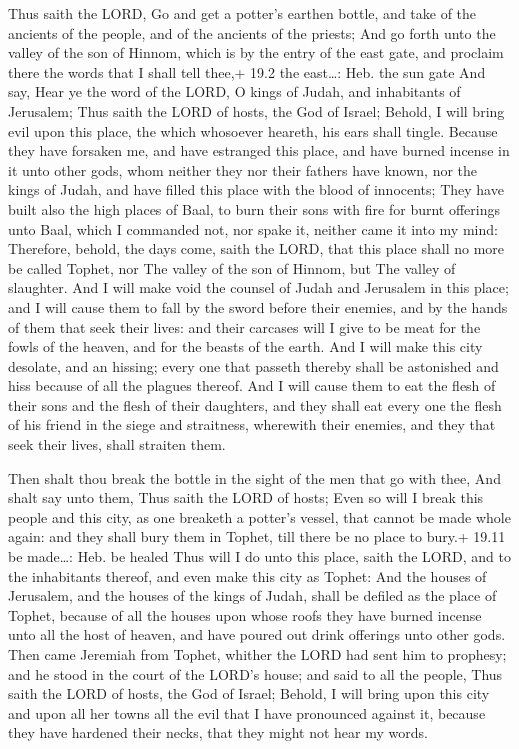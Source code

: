  Thus saith the LORD, Go and get a potter's earthen bottle,
and take of the ancients of the people, and of the ancients of the
priests;  And go forth unto the valley of the son of Hinnom,
which is by the entry of the east gate, and proclaim there the words
that I shall tell thee,+ 19.2 the east\ldots: Heb. the sun gate
 And say, Hear ye the word of the LORD, O kings of Judah,
and inhabitants of Jerusalem; Thus saith the LORD of hosts, the God of
Israel; Behold, I will bring evil upon this place, the which whosoever
heareth, his ears shall tingle.  Because they have forsaken
me, and have estranged this place, and have burned incense in it unto
other gods, whom neither they nor their fathers have known, nor the
kings of Judah, and have filled this place with the blood of innocents;
 They have built also the high places of Baal, to burn their
sons with fire for burnt offerings unto Baal, which I commanded not, nor
spake it, neither came it into my mind:  Therefore, behold,
the days come, saith the LORD, that this place shall no more be called
Tophet, nor The valley of the son of Hinnom, but The valley of
slaughter.  And I will make void the counsel of Judah and
Jerusalem in this place; and I will cause them to fall by the sword
before their enemies, and by the hands of them that seek their lives:
and their carcases will I give to be meat for the fowls of the heaven,
and for the beasts of the earth.  And I will make this city
desolate, and an hissing; every one that passeth thereby shall be
astonished and hiss because of all the plagues thereof.  And
I will cause them to eat the flesh of their sons and the flesh of their
daughters, and they shall eat every one the flesh of his friend in the
siege and straitness, wherewith their enemies, and they that seek their
lives, shall straiten them.

 Then shalt thou break the bottle in the sight of the men
that go with thee,  And shalt say unto them, Thus saith the
LORD of hosts; Even so will I break this people and this city, as one
breaketh a potter's vessel, that cannot be made whole again: and they
shall bury them in Tophet, till there be no place to bury.+ 19.11 be
made\ldots: Heb. be healed  Thus will I do unto this place,
saith the LORD, and to the inhabitants thereof, and even make this city
as Tophet:  And the houses of Jerusalem, and the houses of
the kings of Judah, shall be defiled as the place of Tophet, because of
all the houses upon whose roofs they have burned incense unto all the
host of heaven, and have poured out drink offerings unto other gods.
 Then came Jeremiah from Tophet, whither the LORD had sent
him to prophesy; and he stood in the court of the LORD's house; and said
to all the people,  Thus saith the LORD of hosts, the God
of Israel; Behold, I will bring upon this city and upon all her towns
all the evil that I have pronounced against it, because they have
hardened their necks, that they might not hear my words.


